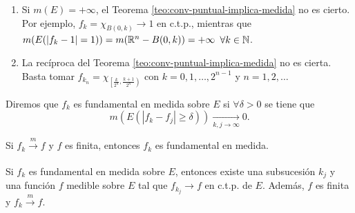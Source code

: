 \begin{observacion}{}
\begin{enumerate}
    \item Si $m(E)=+\infty$, el Teorema \ref{teo:conv-puntual-implica-medida} no es cierto. 
    Por ejemplo,  $f_k=\chi_{B(0,k)} \to 1$ en c.t.p., mientras que 
    $m(E(|f_k-1|=1 ))=m(\mathbb{R}^n-B(0,k))= +\infty$\; $\forall k\in \mathbb{N}$.
    \item La rec\'iproca del Teorema \ref{teo:conv-puntual-implica-medida} no es cierta. 
    Basta tomar $f_{k_n}=\chi_{\left[\frac{k}{2^n}, \frac{k+1}{2^n}\right)}$ con 
    $k=0,1, \ldots, 2^{n-1}$ y $n=1,2,\ldots$
\end{enumerate}
\end{observacion}{}

\begin{definicion}{}
Diremos que $f_k$ es fundamental en medida sobre $E$ si $\forall \delta>0$ se tiene que 
\[
m\left(E\left(\left|f_k-f_j\right|\geq \delta\right)\right)\xrightarrow[k,j \to \infty]{} 0.
\]
\end{definicion}

\begin{observacion}{}
Si $f_k \xrightarrow[]{m}f$ y $f$ es finita, entonces $f_k$ es fundamental en medida. 
\end{observacion}



\begin{teorema}{}
Si $f_k$ es fundamental en medida sobre $E$, entonces existe una subsucesi\'on $k_j$ y una funci\'on $f$ medible sobre $E$ tal que $f_{k_j}\to f$ en c.t.p. de $E$. Adem\'as, $f$ es finita y $f_{k} \xrightarrow[]{m}f$.
\end{teorema}

